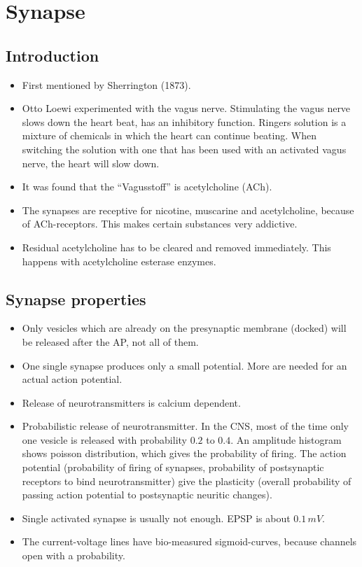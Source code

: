 \documentclass[a4paper, 12pt]{article}
\begin{document}
\begin{figure}[H]
\begin{subfigure}[b]{0.35\textwidth}
	\end{subfigure}
\end{figure}

\section{Synapse}
\subsection{Introduction}
\begin{itemize}[noitemsep,nolistsep]
	\item First mentioned by Sherrington (1873).
	\item Otto Loewi experimented with the vagus nerve.
	\subitem Stimulating the vagus nerve slows down the heart beat, has an inhibitory function.
	\subitem Ringers solution is a mixture of chemicals in which the heart can continue beating.
	\subitem When switching the solution with one that has been used with an activated vagus nerve, the heart will slow down.
	\item It was found that the ``Vagusstoff'' is acetylcholine (ACh).
	\item The synapses are receptive for nicotine, muscarine and acetylcholine, because of ACh-receptors. This makes certain substances very addictive.
	\item Residual acetylcholine has to be cleared and removed immediately. This happens with acetylcholine esterase enzymes.
\end{itemize}

\subsection{Synapse properties}
\begin{itemize}[noitemsep,nolistsep]
	\item Only vesicles which are already on the presynaptic membrane (docked) will be released after the AP, not all of them.
	\item One single synapse produces only a small potential. More are needed for an actual action potential.
	\item Release of neurotransmitters is calcium dependent.
	\item Probabilistic release of neurotransmitter.
	\subitem In the CNS, most of the time only one vesicle is released with probability $0.2$ to $0.4$.
	\subitem An amplitude histogram shows poisson distribution, which gives the probability of firing.
	\subitem The action potential (probability of firing of synapses, probability of postsynaptic receptors to bind neurotransmitter) give the plasticity (overall probability of passing action potential to postsynaptic neuritic changes).
	\item Single activated synapse is usually not enough. EPSP is about $0.1\,mV$.
	\item The current-voltage lines have bio-measured sigmoid-curves, because channels open with a probability.
\end{itemize}
\end{document}
